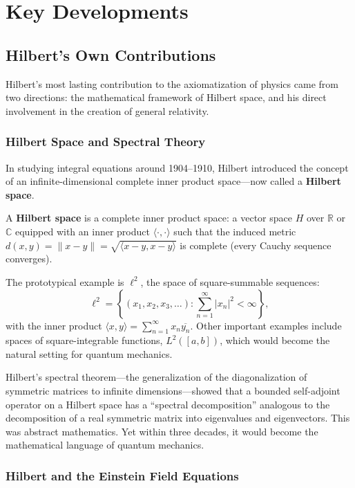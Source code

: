 \section{Key Developments}

\subsection{Hilbert's Own Contributions}

Hilbert's most lasting contribution to the axiomatization of physics came from two directions: the mathematical framework of Hilbert space, and his direct involvement in the creation of general relativity.

\subsubsection{Hilbert Space and Spectral Theory}

In studying integral equations around 1904--1910, Hilbert introduced the concept of an infinite-dimensional complete inner product space---now called a \textbf{Hilbert space}.

\begin{definition}
A \textbf{Hilbert space} is a complete inner product space: a vector space $H$ over $\mathbb{R}$ or $\mathbb{C}$ equipped with an inner product $\langle \cdot, \cdot \rangle$ such that the induced metric $d(x,y) = \|x - y\| = \sqrt{\langle x-y, x-y \rangle}$ is complete (every Cauchy sequence converges).
\end{definition}

The prototypical example is $\ell^2$, the space of square-summable sequences:
\[
    \ell^2 = \left\{ (x_1, x_2, x_3, \ldots) : \sum_{n=1}^{\infty} |x_n|^2 < \infty \right\},
\]
with the inner product $\langle x, y \rangle = \sum_{n=1}^{\infty} x_n \overline{y_n}$. Other important examples include spaces of square-integrable functions, $L^2([a,b])$, which would become the natural setting for quantum mechanics.

Hilbert's spectral theorem---the generalization of the diagonalization of symmetric matrices to infinite dimensions---showed that a bounded self-adjoint operator on a Hilbert space has a ``spectral decomposition'' analogous to the decomposition of a real symmetric matrix into eigenvalues and eigenvectors. This was abstract mathematics. Yet within three decades, it would become the mathematical language of quantum mechanics.

\subsubsection{Hilbert and the Einstein Field Equations}

